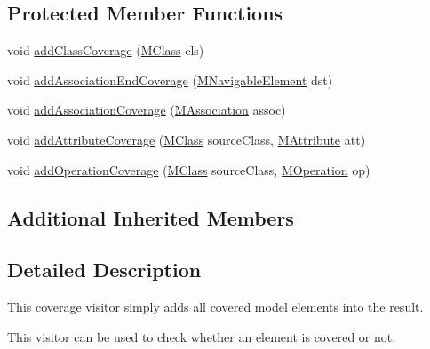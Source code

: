 \subsection*{Protected Member Functions}
\begin{DoxyCompactItemize}
\item 
void \hyperlink{classorg_1_1tzi_1_1use_1_1analysis_1_1coverage_1_1_basic_expression_coverage_calulator_a4cdc3ee3a14a4c1da7da49fd0407714e}{add\-Class\-Coverage} (\hyperlink{interfaceorg_1_1tzi_1_1use_1_1uml_1_1mm_1_1_m_class}{M\-Class} cls)
\item 
void \hyperlink{classorg_1_1tzi_1_1use_1_1analysis_1_1coverage_1_1_basic_expression_coverage_calulator_a15eb2bb868a2c36ce71f58fb25965fe1}{add\-Association\-End\-Coverage} (\hyperlink{interfaceorg_1_1tzi_1_1use_1_1uml_1_1mm_1_1_m_navigable_element}{M\-Navigable\-Element} dst)
\item 
void \hyperlink{classorg_1_1tzi_1_1use_1_1analysis_1_1coverage_1_1_basic_expression_coverage_calulator_af652750f36fd4874ae8f83c29546300c}{add\-Association\-Coverage} (\hyperlink{interfaceorg_1_1tzi_1_1use_1_1uml_1_1mm_1_1_m_association}{M\-Association} assoc)
\item 
void \hyperlink{classorg_1_1tzi_1_1use_1_1analysis_1_1coverage_1_1_basic_expression_coverage_calulator_ab5b45004ed4d029e025bd1bfeefc6127}{add\-Attribute\-Coverage} (\hyperlink{interfaceorg_1_1tzi_1_1use_1_1uml_1_1mm_1_1_m_class}{M\-Class} source\-Class, \hyperlink{classorg_1_1tzi_1_1use_1_1uml_1_1mm_1_1_m_attribute}{M\-Attribute} att)
\item 
void \hyperlink{classorg_1_1tzi_1_1use_1_1analysis_1_1coverage_1_1_basic_expression_coverage_calulator_abdd5a45eebcc3772d5d9e0afbaf23ae0}{add\-Operation\-Coverage} (\hyperlink{interfaceorg_1_1tzi_1_1use_1_1uml_1_1mm_1_1_m_class}{M\-Class} source\-Class, \hyperlink{classorg_1_1tzi_1_1use_1_1uml_1_1mm_1_1_m_operation}{M\-Operation} op)
\end{DoxyCompactItemize}
\subsection*{Additional Inherited Members}


\subsection{Detailed Description}
This coverage visitor simply adds all covered model elements into the result. 

This visitor can be used to check whether an element is covered or not.

